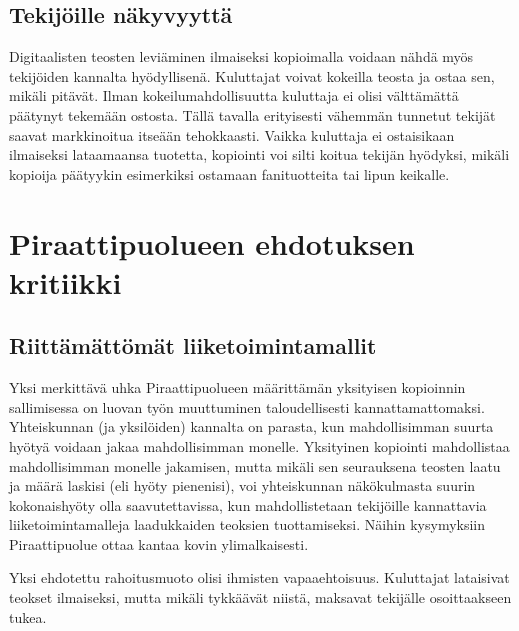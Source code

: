 \documentclass[titlepage,12pt]{article}
\begin{document}
\subsection{Tekijöille näkyvyyttä}

Digitaalisten teosten leviäminen ilmaiseksi kopioimalla voidaan nähdä
myös tekijöiden kannalta hyödyllisenä.  Kuluttajat voivat kokeilla
teosta ja ostaa sen, mikäli pitävät.  Ilman kokeilumahdollisuutta
kuluttaja ei olisi välttämättä päätynyt tekemään ostosta.  Tällä
tavalla erityisesti vähemmän tunnetut tekijät saavat markkinoitua
itseään tehokkaasti.  Vaikka kuluttaja ei ostaisikaan ilmaiseksi
lataamaansa tuotetta, kopiointi voi silti koitua tekijän hyödyksi,
mikäli kopioija päätyykin esimerkiksi ostamaan fanituotteita tai lipun
keikalle.


\section{Piraattipuolueen ehdotuksen kritiikki}

\subsection{Riittämättömät liiketoimintamallit}

Yksi merkittävä uhka Piraattipuolueen määrittämän yksityisen
kopioinnin sallimisessa on luovan työn muuttuminen taloudellisesti
kannattamattomaksi.  Yhteiskunnan (ja yksilöiden) kannalta on parasta,
kun mahdollisimman suurta hyötyä voidaan jakaa mahdollisimman monelle.
Yksityinen kopiointi mahdollistaa mahdollisimman monelle jakamisen,
mutta mikäli sen seurauksena teosten laatu ja määrä laskisi (eli hyöty
pienenisi), voi yhteiskunnan näkökulmasta suurin kokonaishyöty olla
saavutettavissa, kun mahdollistetaan tekijöille kannattavia
liiketoimintamalleja laadukkaiden teoksien tuottamiseksi.  Näihin
kysymyksiin Piraattipuolue ottaa kantaa kovin ylimalkaisesti.



Yksi ehdotettu rahoitusmuoto olisi ihmisten vapaaehtoisuus.
Kuluttajat lataisivat teokset ilmaiseksi, mutta mikäli tykkäävät
niistä, maksavat tekijälle osoittaakseen tukea.
\end{document}
